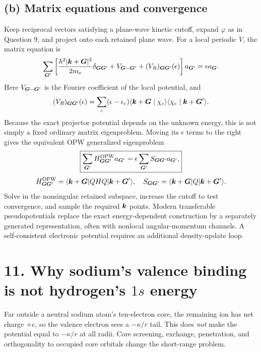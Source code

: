 \subsection*{(b) Matrix equations and convergence}
Keep reciprocal vectors satisfying a plane-wave kinetic cutoff, expand $\varphi$ as in Question 9, and project onto each retained plane wave. For a local periodic $V$, the matrix equation is
\[
\sum_{\boldsymbol{G}'}\left[
\frac{\hbar^2|\boldsymbol{k}+\boldsymbol{G}|^2}{2m_e}\delta_{\boldsymbol{G}\boldsymbol{G}'}
+V_{\boldsymbol{G}-\boldsymbol{G}'}+(V_R)_{\boldsymbol{G}\boldsymbol{G}'}(\epsilon)
\right]a_{\boldsymbol{G}'}=\epsilon a_{\boldsymbol{G}}.
\]
Here $V_{\boldsymbol{G}-\boldsymbol{G}'}$ is the Fourier coefficient of the local potential, and
\[
(V_R)_{\boldsymbol{G}\boldsymbol{G}'}(\epsilon)=\sum_c(\epsilon-\epsilon_c)
\langle\boldsymbol{k}+\boldsymbol{G}\mid\chi_c\rangle\langle\chi_c\mid\boldsymbol{k}+\boldsymbol{G}'\rangle.
\]
Because the exact projector potential depends on the unknown energy, this is not simply a fixed ordinary matrix eigenproblem. Moving its $\epsilon$ terms to the right gives the equivalent OPW generalized eigenproblem
\[
\boxed{\sum_{\boldsymbol{G}'}H^{\rm OPW}_{\boldsymbol{G}\boldsymbol{G}'}a_{\boldsymbol{G}'}
=\epsilon\sum_{\boldsymbol{G}'}S_{\boldsymbol{G}\boldsymbol{G}'}a_{\boldsymbol{G}'},}
\]
\[
H^{\rm OPW}_{\boldsymbol{G}\boldsymbol{G}'}=
\langle\boldsymbol{k}+\boldsymbol{G}\rvert QHQ\lvert\boldsymbol{k}+\boldsymbol{G}'\rangle,\quad
S_{\boldsymbol{G}\boldsymbol{G}'}=\langle\boldsymbol{k}+\boldsymbol{G}\rvert Q\lvert\boldsymbol{k}+\boldsymbol{G}'\rangle.
\]
Solve in the nonsingular retained subspace, increase the cutoff to test convergence, and sample the required $\boldsymbol{k}$ points. Modern transferable pseudopotentials replace the exact energy-dependent construction by a separately generated representation, often with nonlocal angular-momentum channels. A self-consistent electronic potential requires an additional density-update loop.

\section*{11. Why sodium's valence binding is not hydrogen's $1s$ energy}
Far outside a neutral sodium atom's ten-electron core, the remaining ion has net charge $+e$, so the valence electron sees a $-\kappa/r$ tail. This does \emph{not} make the potential equal to $-\kappa/r$ at all radii. Core screening, exchange, penetration, and orthogonality to occupied core orbitals change the short-range problem.

